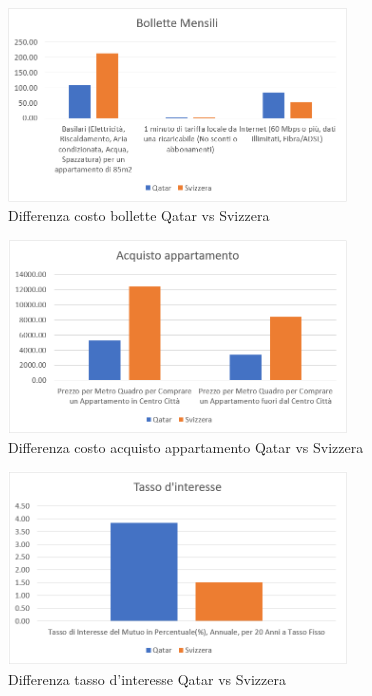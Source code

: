 \documentclass[a4paper, 12pt]{article}
\begin{document}
\begin{figure}[h]
    \centering
    \includegraphics[width=0.8\textwidth]{images/bollette.png}
    \caption{Differenza costo bollette Qatar vs Svizzera}
\end{figure}

\pagebreak

\begin{figure}[h]
    \centering
    \includegraphics[width=0.8\textwidth]{images/appartamento.png}
    \caption{Differenza costo acquisto appartamento Qatar vs Svizzera}
\end{figure}

\begin{figure}[h]
    \centering
    \includegraphics[width=0.8\textwidth]{images/tassointeresse.png}
    \caption{Differenza tasso d'interesse Qatar vs Svizzera}
\end{figure}
\end{document}

